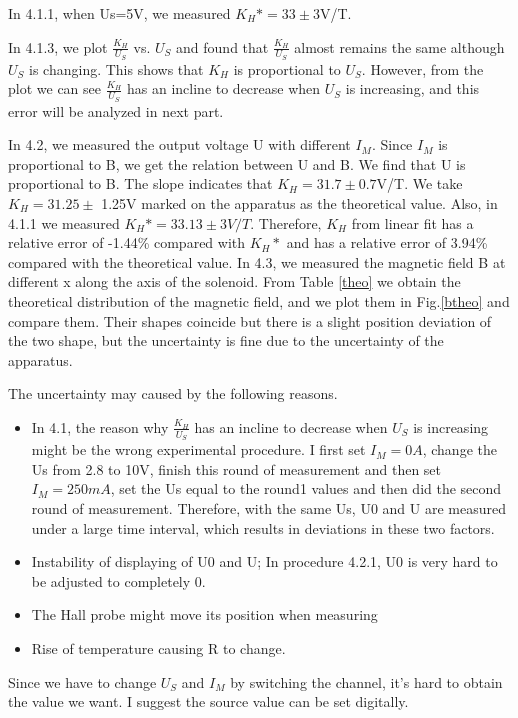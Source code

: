 \documentclass[12pt,a4paper]{article}
\begin{document}
In 4.1.1, when Us=5V, we measured $K_H\ast=33\pm$3V/T.\par 
In 4.1.3, we plot $\frac{K_H}{U_S}$ vs. $U_S$ and found that $\frac{K_H}{U_S}$ almost remains the same although $U_S$ is changing. This shows that $K_H$ is proportional to $U_S$. However, from the plot we can see $\frac{K_H}{U_S}$ has an incline to decrease when $U_S$ is increasing, and this error will be analyzed in next part. \par 
In 4.2, we measured the output voltage U with different $I_M$. Since $I_M$ is proportional to B, we get the relation between U and B. We find that U is proportional to B. The slope indicates that $K_H=31.7\pm0.7$V/T. 
We take $K_H=31.25\pm$ 1.25V marked on the apparatus as the theoretical value. Also, in 4.1.1 we measured $K_H\ast=33.13\pm3V/T$. Therefore, $K_H$ from linear fit has a relative error of -1.44\% compared with $K_H\ast$ and has a relative error of 3.94\% compared with the theoretical value.
In 4.3, we measured the magnetic field B at different x along the axis of the solenoid. From Table \ref{theo} we obtain the theoretical distribution of the magnetic field, and we plot them in Fig.\ref{btheo} and compare them. Their shapes coincide but there is a slight position deviation of the two shape, but the uncertainty is fine due to the uncertainty of the apparatus.\par
The uncertainty may caused by the following reasons.
\begin{itemize}
    \item 	In 4.1, the reason why $\frac{K_H}{U_S}$ has an incline to decrease when $U_S$ is increasing might be the wrong experimental procedure. I first set $I_M=0A$, change the Us from 2.8 to 10V, finish this round of measurement and then set $I_M=250mA$, set the Us equal to the round1 values and then did the second round of measurement. Therefore, with the same Us, U0 and U are measured under a large time interval, which results in deviations in these two factors.
    \item Instability of displaying of U0 and U; In procedure 4.2.1, U0 is very hard to be adjusted to completely 0.
    \item The Hall probe might move its position when measuring
    \item Rise of temperature causing R to change.
\end{itemize}
Since we have to change $U_S$ and $I_M$ by switching the channel, it’s hard to obtain the value we want. I suggest the source value can be set digitally.
\end{document}
